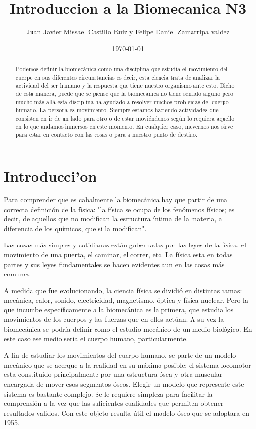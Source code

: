 \documentclass{article}
\author{Juan Javier Missael Castillo Ruiz y Felipe Daniel Zamarripa valdez} %
\title{Introduccion a la Biomecanica N3} %
\date{\today}
\begin{document}

\maketitle %

\begin{abstract} %
Podemos definir la biomecánica como una disciplina que estudia el movimiento del cuerpo en sus diferentes circunstancias es decir, esta ciencia trata de analizar la actividad del ser humano y la respuesta que tiene nuestro organismo ante esto. Dicho de esta manera, puede que se piense que la biomecánica no tiene sentido alguno pero mucho más allá esta disciplina ha ayudado a resolver muchos problemas del cuerpo humano. La persona es movimiento. Siempre estamos haciendo actividades que consisten en ir de un lado para otro o de estar moviéndonos según lo requiera aquello en lo que andamos inmersos en este momento. En cualquier caso, movernos nos sirve para estar en contacto con las cosas o para a nuestro punto de destino.
\end{abstract}

\section{Introducci'{o}n}\label{intro} %


 Para comprender que es cabalmente la biomecánica hay que partir de una correcta definición de la física: "la física se ocupa de los fenómenos físicos; es decir, de aquellos que no modifican la estructura íntima de la materia, a diferencia de los químicos, que si la modifican".

Las cosas más simples y cotidianas están gobernadas por las leyes de la física: el movimiento de una puerta, el caminar, el correr, etc. La física esta en todas partes y sus leyes fundamentales se hacen evidentes aun en las cosas más comunes.

A medida que fue evolucionando, la ciencia física se dividió en distintas ramas: mecánica, calor, sonido, electricidad, magnetismo, óptica y física nuclear. Pero la que incumbe específicamente a la biomecánica es la primera, que estudia los movimientos de los cuerpos y las fuerzas que en ellos actúan. A su vez la biomecánica se podría definir como el estudio mecánico de un medio biológico. En este caso ese medio seria el cuerpo humano, particularmente.

A fin de estudiar los movimientos del cuerpo humano, se parte de un modelo mecánico que se acerque a la realidad en su máximo posible: el sistema locomotor esta constituido principalmente por una estructura ósea y otra muscular encargada de mover esos segmentos óseos. Elegir un modelo que represente este sistema es bastante complejo. Se le requiere simpleza para facilitar la comprensión a la vez que las suficientes cualidades que permiten obtener resultados validos. Con este objeto resulta útil el modelo óseo que se adoptara en 1955.
\end{document}
